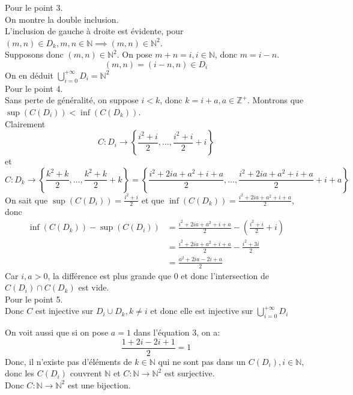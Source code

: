 \documentclass[11pt, a4paper]{article}
\begin{document}
		Pour le point 3.\\
		On montre la double inclusion.\\
		L'inclusion de gauche à droite est évidente, pour $(m,n) \in D_k, m,n \in \mathbb{N} \implies ( m,n) \in \mathbb{N}^{2}$.\\
		Supposons donc $(m,n) \in \mathbb{N}^{2}$. On pose $m+n=i, i \in \mathbb{N}$, donc $m=i-n$.
		\[ 
			(m,n) = (i-n,n) \in D_i
		\]
		On en déduit $\bigcup_{i=0}^{+\infty} D_i = \mathbb{N}^{2}$\\
		Pour le point 4.\\
		Sans perte de généralité, on suppose $i<k$, donc $k= i+a, a \in \mathbb{Z}^{+} $.
		Montrons que $\sup(C(D_i)) < \inf(C(D_k))$.\\
		Clairement
		\[ 
			C: D_i \to \left\{ \frac{i^{2}+i}{2}, \ldots,  \frac{i^{2}+i}{2}+i\right\} 
		\]
		et 
		\[ 
			C: D_k \to \left\{ \frac{k^{2}+k}{2}, \ldots,  \frac{k^{2}+k}{2}+k\right\} = \left\{ \frac{i^{2}+2ia+a^{2}+i+a}{2}, \ldots, \frac{i^{2}+2ia+a^{2}+i+a}{2} + i+a\right\} 
		\]
		On sait que $\sup(C(D_i))= \frac{i^{2}+i}{2}$ et que $\inf(C(D_k))= \frac{i^{2}+2ia+a^{2}+i+a}{2}$, donc
		\begin{align}
			\inf(C(D_k)) - \sup(C(D_i)) &= \frac{i^{2}+2ia+a^{2}+i+a}{2} -\left(\frac{i^{2}+i}{2}+i\right)\\
						&= \frac{i^{2}+2ia+a^{2}+i+a}{2} - \frac{i^{2}+3i}{2}\\
						    &=  \frac{a^{2}+2ia-2i+a}{2} 
		\end{align}
		Car $i,a> 0$, la différence est plus grande que $0$ et donc l'intersection de $C(D_i) \cap C(D_k)$ est vide.\\
		Pour le point 5.\\
		Donc $C$ est injective sur $D_i \cup D_k, k \neq i$ et donc elle est injective sur $\bigcup_{i=0}^{+ \infty } D_i$
	
On voit aussi que si on pose $a=1$ dans l'équation 3, on a:
\[ 
\frac{1+2i - 2i+1}{2}=1
\]
Donc, il n'existe pas d'éléments de $k \in \mathbb{N}$ qui ne sont pas dans un $C(D_i),i \in \mathbb{N}$, donc les $C(D_i)$ couvrent $\mathbb{N}$ et $C: \mathbb{N} \to \mathbb{N}^{2}$ est surjective.\\
Donc $C:\mathbb{N} \to \mathbb{N}^{2}$ est une bijection.
\end{document}
